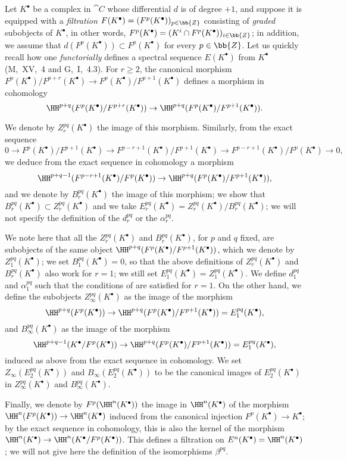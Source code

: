 \begin{env}[11.2.2]
\label{0.11.2.2}
Let $K^\bullet$ be a complex in $\cat{C}$ whose differential $d$ is of degree $+1$, and suppose it is equipped with a \emph{filtration $F(K^\bullet)=(F^p(K^\bullet))_{p\in\bb{Z}}$} consisting of \emph{graded} subobjects
of $K^\bullet$, in other words, $F^p(K^\bullet)=(K^i\cap F^p(K^\bullet))_{i\in\bb{Z}}$; in addition, we assume that $d(F^p(K^\bullet))\subset F^p(K^\bullet)$ for every $p\in\bb{Z}$.
Let us quickly recall how one \emph{functorially} defines a spectral sequence $E(K^\bullet)$ from $K^\bullet$ (M,~XV,~4 and G,~I,~4.3).
For $r\geq 2$, the canonical morphism $F^p(K^\bullet)/F^{p+r}(K^\bullet)\to F^p(K^\bullet)/F^{p+1}(K^\bullet)$ defines a morphism in cohomology
\[
  \HH^{p+q}(F^p(K^\bullet)/F^{p+r}(K^\bullet))\to\HH^{p+q}(F^p(K^\bullet)/F^{p+1}(K^\bullet)).
\]

We denote by $Z_r^{pq}(K^\bullet)$ the image of this morphism.
Similarly, from the exact sequence
\[
  0\to F^p(K^\bullet)/F^{p+1}(K^\bullet)\to F^{p-r+1}(K^\bullet)/F^{p+1}(K^\bullet)\to F^{p-r+1}(K^\bullet)/F^p(K^\bullet)\to 0,
\]
we deduce from the exact sequence in cohomology a morphism
\[
  \HH^{p+q-1}(F^{p-r+1}(K^\bullet)/F^p(K^\bullet))\to\HH^{p+q}(F^p(K^\bullet)/F^{p+1}(K^\bullet)),
\]
and we denote by $B_r^{pq}(K^\bullet)$ the image of this morphism; we show that $B_r^{pq}(K^\bullet)\subset Z_r^{pq}(K^\bullet)$ and we take $E_r^{pq}(K^\bullet)=Z_r^{pq}(K^\bullet)/B_r^{pq}(K^\bullet)$; we will not specify the definition of the $d_r^{pq}$ or the $\alpha_r^{pq}$.

We note here that all the $Z_r^{pq}(K^\bullet)$ and $B_r^{pq}(K^\bullet)$, for $p$ and $q$ fixed, are subobjects of the same object $\HH^{p+q}(F^p(K^\bullet)/F^{p+1}(K^\bullet))$, which we denote by $Z_1^{pq}(K^\bullet)$; we set $B_1^{pq}(K^\bullet)=0$, so that the above definitions of $Z_r^{pq}(K^\bullet)$ and $B_r^{pq}(K^\bullet)$ also work for $r=1$; we still set $E_1^{pq}(K^\bullet)=Z_1^{pq}(K^\bullet)$.
We define $d_1^{pq}$ and $\alpha_1^{pq}$ such that the conditions of  are satisfied for $r=1$.
On the other hand, we define the subobjects $Z_\infty^{pq}(K^\bullet)$ as the image of the morphism
\[
  \HH^{p+q}(F^p(K^\bullet))\to\HH^{p+q}(F^p(K^\bullet)/F^{p+1}(K^\bullet))=E_1^{pq}(K^\bullet),
\]
and $B_\infty^{pq}(K^\bullet)$ as the image of the morphism
\[
  \HH^{p+q-1}(K^\bullet/F^p(K^\bullet))\to\HH^{p+q}(F^p(K^\bullet)/F^{p+1}(K^\bullet))=E_1^{pq}(K^\bullet),
\]
induced as above from the exact sequence in cohomology.
We set $Z_\infty(E_2^{pq}(K^\bullet))$ and $B_\infty(E_2^{pq}(K^\bullet))$ to be the canonical images of $E_2^{pq}(K^\bullet)$ in $Z_\infty^{pq}(K^\bullet)$ and $B_\infty^{pq}(K^\bullet)$.

Finally, we denote by $F^p(\HH^n(K^\bullet))$ the image in $\HH^n(K^\bullet)$ of the morphism $\HH^n(F^p(K^\bullet))\to\HH^n(K^\bullet)$ induced from the canonical injection $F^p(K^\bullet)\to K^\bullet$; by the exact sequence in cohomology, this is also the kernel of the morphism $\HH^n(K^\bullet)\to\HH^n(K^\bullet/F^p(K^\bullet))$.
This defines a filtration on $E^n(K^\bullet)=\HH^n(K^\bullet)$; we will not give here the definition of the isomorphisms $\beta^{pq}$.
\end{env}
